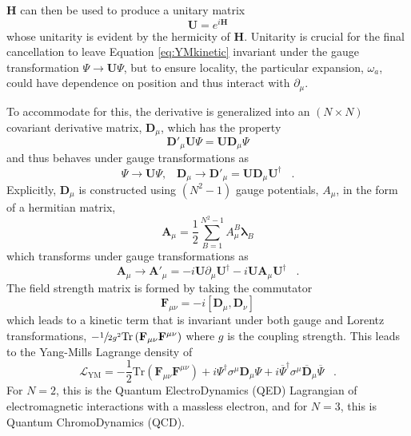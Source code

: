  $\mathbf{H}$ can then be used to produce 
  a unitary matrix
\begin{equation}\label{eq:umatrix}
  \boldsymbol{U}=e^{i\mathbf{H}}
\end{equation}
  whose unitarity is evident by the
  hermicity of $\mathbf{H}$.
 Unitarity is crucial for the final
  cancellation to leave Equation \ref{eq:YMkinetic}
  invariant under the gauge transformation
 $\Psi\rightarrow \boldsymbol{U}\Psi$,
  but to ensure locality, 
  the particular expansion, $\omega_a$,
  could have dependence on position
  and thus interact with $\partial_\mu$.

 To accommodate for this, 
  the derivative is generalized into an
  $(N\times N)$ covariant derivative matrix, 
  $\boldsymbol{D}_\mu$,
  which has the property
\begin{equation}\label{eq:covardir}
 \boldsymbol{D'}_\mu\boldsymbol{U}\Psi =
 \boldsymbol{U}\boldsymbol{D}_\mu \Psi
\end{equation}
  and thus behaves under gauge transformations as
\begin{equation}\label{eq:dtransform}
 \Psi\rightarrow \boldsymbol{U}\Psi,\;\;\;
 \boldsymbol{D}_\mu \rightarrow \boldsymbol{D'}_\mu = 
  \boldsymbol{U} \boldsymbol{D}_\mu \boldsymbol{U}^\dagger\;\;\;.
\end{equation}
 Explicitly, $\boldsymbol{D}_\mu$ is constructed using 
 $(N^2-1)$ gauge potentials, $A_\mu$,
 in the form of a hermitian matrix, 
\begin{equation}\label{eq:amatrix}
 \mathbf{A}_\mu = \frac{1}{2}\sum_{B=1}^{N^2-1}
  A_\mu^B\boldsymbol{\lambda}_B
\end{equation}
 which transforms under gauge transformations as
\begin{equation}\label{eq:agauge}
 \mathbf{A}_\mu \rightarrow \mathbf{A'}_\mu = 
  -i\boldsymbol{U}\partial_\mu\boldsymbol{U}^\dagger 
  -i\boldsymbol{U} \mathbf{A}_\mu \boldsymbol{U}^\dagger \;\;\;.
\end{equation}
 The field strength matrix is formed by taking the commutator 
\begin{equation}\label{eq:fieldstrength}
 \mathbf{F}_{\mu\nu} = -i[\boldsymbol{D}_\mu,\boldsymbol{D}_\nu]
\end{equation}
 which leads to a kinetic term that is invariant under
 both gauge and Lorentz transformations,
 $-\sfrac{1}{2g^2}\mathrm{Tr}\left(\mathbf{F}_{\mu\nu}\mathbf{F}^{\mu\nu}\right)$
 where $g$ is the coupling strength.
This leads to the Yang-Mills Lagrange density of 
\begin{equation}\label{eq:YMlagrange}
 \mathcal{L}_{\mathrm{YM}}=-\frac{1}{2}\mathrm{Tr}\left(\mathbf{F}_{\mu\nu}\mathbf{F}^{\mu\nu}\right)+
 i\Psi^\dagger\sigma^\mu\boldsymbol{D}_\mu\Psi+
 i\overline{\Psi}^\dagger\sigma^\mu\overline{\boldsymbol{D}}_\mu\overline{\Psi}\;\;\;.
\end{equation}
 For $N=2$, this is the Quantum ElectroDynamics (QED) Lagrangian
  of electromagnetic interactions with a massless electron,
  and for $N=3$, this is Quantum ChromoDynamics (QCD).

